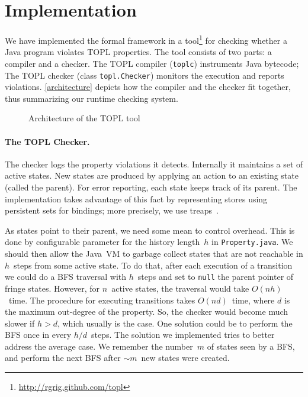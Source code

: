 \documentclass[9pt, preprint]{sigplanconf} %
\theoremstyle{definition}
\theoremstyle{remark}
\begin{document}
\section{Implementation} \label{sec:implementation} %
We have implemented the formal framework in a tool\footnote{\url{http://rgrig.github.com/topl}} for checking whether a Java program violates 
TOPL properties.
The tool consists of two parts: a compiler and a checker.
The TOPL compiler ({\tt toplc}) instruments Java bytecode;
The TOPL checker (class {\tt topl.Checker}) monitors the execution and reports violations.
\autoref{architecture} depicts how the compiler and the checker fit together, thus summarizing our runtime checking system.

\begin{figure}[t]
\begin{center}

\caption{Architecture of the TOPL tool}
\label{architecture}
\end{center}
\end{figure}

\paragraph{The TOPL Checker.} %
The checker logs the property violations it detects. 
Internally it  maintains a set of active states.
New states are  produced by applying an action to an existing state (called the parent).
For error reporting, each state keeps track of its parent.
The implementation takes advantage of this fact by representing stores
using persistent sets for bindings;  more precisely, we use treaps~\cite{DBLP:conf/focs/AragonS89}.

As states point to their parent, we need some mean to control overhead.  This is done by configurable parameter for 
the history length~$h$ in {\tt Property.java}.
We should then allow the Java~VM to garbage collect states that are not reachable in $h$~steps from some active state.
To do that, after each execution of a transition we could do a BFS traversal with $h$~steps and set to {\tt null} the parent pointer of fringe states.
However, for $n$~active states, the traversal would take $O(nh)$~time.
The procedure for executing transitions takes $O(nd)$~time, where $d$ is the maximum out-degree of the property.
So, the checker would become much slower if $h>d$, which usually is the case.
%
One solution could be to perform the BFS once in every $h/d$~steps.
The solution we implemented tries to better address the average case.
We remember the number~$m$ of states seen by a BFS, and perform the next BFS after $\sim m$~new states were created.
\end{document}
